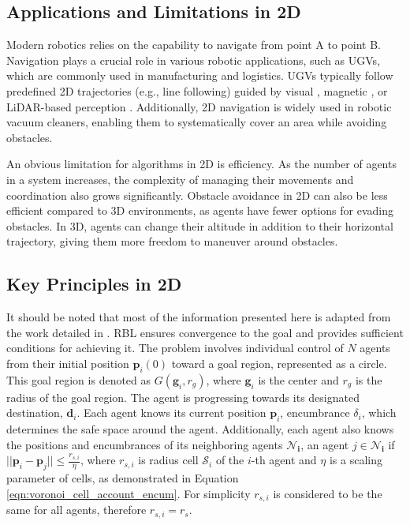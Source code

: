     \subsection{Applications and Limitations in 2D}
        Modern robotics relies on the capability to navigate from point A to point B.
        Navigation plays a crucial role in various robotic applications, such as \ac{UGV}s, which are commonly used in manufacturing and logistics. 
        \ac{UGV}s typically follow predefined 2D trajectories (e.g., line following) guided by visual \cite{vision_navigation}, magnetic \cite{magnetic_navigation}, or \ac{LiDAR}-based perception \cite{lidar_navigation}. 
        Additionally, 2D navigation is widely used in robotic vacuum cleaners, enabling them to systematically cover an area while avoiding obstacles.

        An obvious limitation for algorithms in 2D is efficiency. 
        As the number of agents in a system increases, the complexity of managing their movements and coordination also grows significantly.
        Obstacle avoidance in 2D can also be less efficient compared to 3D environments, as agents have fewer options for evading obstacles. 
        In 3D, agents can change their altitude in addition to their horizontal trajectory, giving them more freedom to maneuver around obstacles.

    \subsection{Key Principles in 2D}
        It should be noted that most of the information presented here is adapted from the work detailed in \cite{rbl_paper}.
        RBL ensures convergence to the goal and provides sufficient conditions for achieving it. 
        The problem involves individual control of $N$ agents from their initial position $\mathbf{p}_i(0)$ toward a goal region, represented as a circle.
        This goal region is denoted as $G(\mathbf{g}_i, r_g)$, where $\mathbf{g}_i$ is the center and $r_g$ is the radius of the goal region. 
        The agent is progressing towards its designated destination, $\mathbf{d}_i$.
        Each agent knows its current position $\mathbf{p}_i$, encumbrance $\delta_i$, which determines the safe space around the agent.
        Additionally, each agent also knows the positions and encumbrances of its neighboring agents $\mathbf{\mathcal{N}_i}$, an agent $j \in \mathbf{\mathcal{N}_i}$ if $||\mathbf{p}_i - \mathbf{p}_j|| \leq \frac{r_{s,i}}{\eta}$, where $r_{s,i}$ is radius cell $\mathcal{S}_i$ of the $i$-th agent and $\eta$ is a scaling parameter of cells, as demonstrated in Equation \eqref{eqn:voronoi_cell_account_encum}.
        For simplicity $r_{s,i}$ is considered to be the same for all agents, therefore $r_{s,i} = r_s$. 

